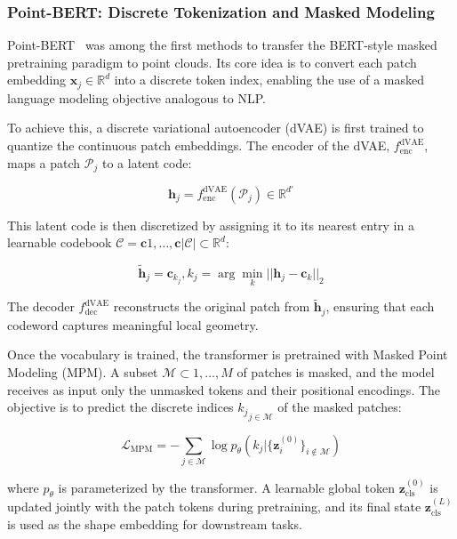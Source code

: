 \subsubsection{Point-BERT: Discrete Tokenization and Masked Modeling}
\label{sssec:pointbert}

Point-BERT~\cite{pbert} was among the first methods to transfer the BERT-style masked pretraining paradigm to point clouds. Its core idea is to convert each patch embedding $\mathbf{x}_j \in \mathbb{R}^d$ into a discrete token index, enabling the use of a masked language modeling objective analogous to NLP.

To achieve this, a discrete variational autoencoder (dVAE) is first trained to quantize the continuous patch embeddings. The encoder of the dVAE, $f_{\text{enc}}^{\text{dVAE}}$, maps a patch $\mathcal{P}_j$ to a latent code:

\begin{equation}
    \mathbf{h}_j = f_{\text{enc}}^{\text{dVAE}}(\mathcal{P}_j) \in \mathbb{R}^{d'}
\end{equation}

This latent code is then discretized by assigning it to its nearest entry in a learnable codebook $\mathcal{C} = { \mathbf{c}1, \dots, \mathbf{c}{|\mathcal{C}|} } \subset \mathbb{R}^d$:

\begin{equation}
    \tilde{\mathbf{h}}_j = \mathbf{c}_{k_j}, k_j = \arg\min_{k} || \mathbf{h}_j - \mathbf{c}_k ||_2
\end{equation}

The decoder $f_{\text{dec}}^{\text{dVAE}}$ reconstructs the original patch from $\tilde{\mathbf{h}}_j$, ensuring that each codeword captures meaningful local geometry.

Once the vocabulary is trained, the transformer is pretrained with Masked Point Modeling (MPM). A subset $\mathcal{M} \subset {1, \dots, M}$ of patches is masked, and the model receives as input only the unmasked tokens and their positional encodings. The objective is to predict the discrete indices ${k_j}_{j \in \mathcal{M}}$ of the masked patches:

\begin{equation}
    \mathcal{L}_{\text{MPM}} = - \sum_{j \in \mathcal{M}} \log p_\theta(k_j | \{\mathbf{z}_i^{(0)}\}_{i \notin \mathcal{M}})
\end{equation}

where $p_\theta$ is parameterized by the transformer. A learnable global token $\mathbf{z}_{\text{cls}}^{(0)}$ is updated jointly with the patch tokens during pretraining, and its final state $\mathbf{z}_{\text{cls}}^{(L)}$ is used as the shape embedding for downstream tasks.


